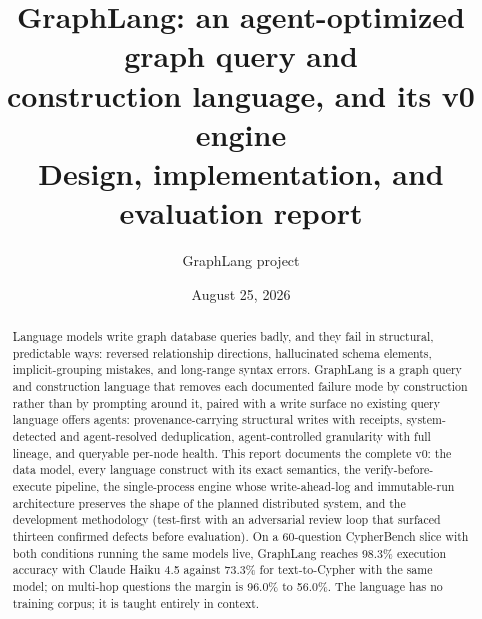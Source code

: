 \documentclass[11pt]{article}
\title{\textbf{GraphLang: an agent-optimized graph query and\\ construction language, and its v0 engine}\\[6pt]
\large Design, implementation, and evaluation report}
\author{GraphLang project}
\date{August 25, 2026}
\begin{document}
\maketitle

\begin{abstract}
\begin{center}
\end{center}

\vspace{1em}

\noindent Language models write graph database queries badly, and they fail in structural, predictable ways: reversed relationship directions, hallucinated schema elements, implicit-grouping mistakes, and long-range syntax errors. GraphLang is a graph query and construction language that removes each documented failure mode by construction rather than by prompting around it, paired with a write surface no existing query language offers agents: provenance-carrying structural writes with receipts, system-detected and agent-resolved deduplication, agent-controlled granularity with full lineage, and queryable per-node health. This report documents the complete v0: the data model, every language construct with its exact semantics, the verify-before-execute pipeline, the single-process engine whose write-ahead-log and immutable-run architecture preserves the shape of the planned distributed system, and the development methodology (test-first with an adversarial review loop that surfaced thirteen confirmed defects before evaluation). On a 60-question CypherBench slice with both conditions running the same models live, GraphLang reaches 98.3\% execution accuracy with Claude Haiku 4.5 against 73.3\% for text-to-Cypher with the same model; on multi-hop questions the margin is 96.0\% to 56.0\%. The language has no training corpus; it is taught entirely in context.
\end{abstract}
\end{document}
